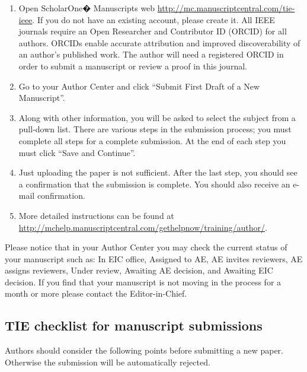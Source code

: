 \documentclass[journal]{IEEEtranTIE}
\begin{document}
\begin{enumerate}[1)]
	\item Open ScholarOne� Manuscripts web \url{http://mc.manuscriptcentral.com/tie-ieee}. If you do not have an existing account, please create it. All IEEE journals require an Open Researcher and Contributor ID (ORCID) for all authors. ORCIDs enable accurate attribution and improved discoverability of an author's published work. The author will need a registered ORCID in order to submit a manuscript or review a proof in this journal.
	\item Go to your Author Center and click ``Submit First Draft of a New Manuscript''.
	\item Along with other information, you will be asked to select the subject from a pull-down list. There are various steps in the submission process; you must complete all steps for a complete submission. At the end of each step you must click ``Save and Continue''.
	\item Just uploading the paper is not sufficient. After the last step, you should see a confirmation that the submission is complete. You should also receive an e-mail confirmation.
	\item More detailed instructions can be found at \url{http://mchelp.manuscriptcentral.com/gethelpnow/training/author/}.
\end{enumerate}

Please notice that in your Author Center you may check the current status of your manuscript such as: In EIC office, Assigned to AE, AE invites reviewers, AE assigns reviewers, Under review, Awaiting AE decision, and Awaiting EIC decision. If you find that your manuscript is not moving in the process for a month or more please contact the Editor-in-Chief.

\subsection{TIE checklist for manuscript submissions}

Authors should consider the following points before submitting a new paper. Otherwise the submission will be automatically rejected.
\end{document}
